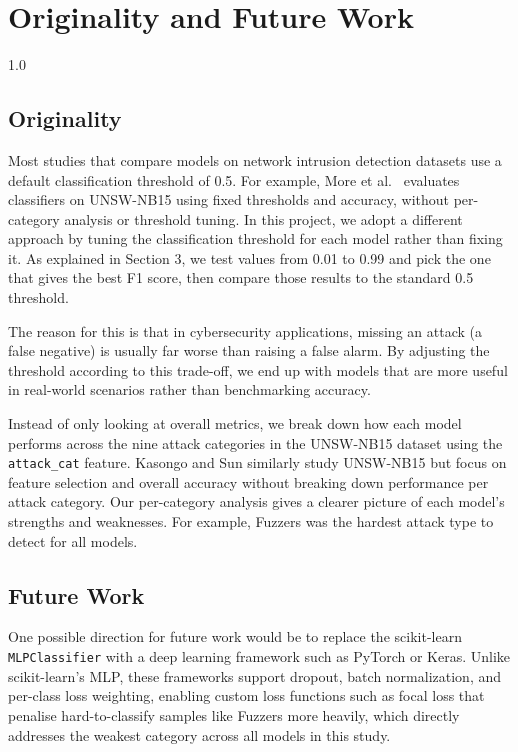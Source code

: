 \chapter{Originality and Future Work}
\begin{spacing}{1.0}
\small

\section{Originality}

Most studies that compare models on network intrusion detection datasets use a default classification threshold of 0.5. For example, More et al.\ \cite{more_2024_unsw} evaluates classifiers on UNSW-NB15 using fixed thresholds and accuracy, without per-category analysis or threshold tuning.
In this project, we adopt a different approach by tuning the classification threshold for each model rather than fixing it. As explained in Section 3, we test values from 0.01 to 0.99 and pick the one that gives the best F1 score, then compare those results to the standard
0.5 threshold.

The reason for this is that in cybersecurity applications, missing an attack (a false negative) is usually far worse than raising a false
alarm. By adjusting the threshold according to this trade-off, we end up with models that are more useful in real-world scenarios rather than benchmarking accuracy.

Instead of only looking at overall metrics, we break down how each model performs across the nine attack categories in the UNSW-NB15 dataset using the \texttt{attack\_cat} feature. Kasongo and Sun \cite{kasongo_sun_unsw} similarly study UNSW-NB15 but focus on feature selection and overall accuracy without breaking down performance per attack category. Our per-category analysis gives a clearer picture of each model's strengths and weaknesses. For example, Fuzzers was the hardest attack type to detect for all models.

\section{Future Work}

One possible direction for future work would be to replace the scikit-learn \texttt{MLPClassifier} with a deep learning
framework such as PyTorch or Keras. Unlike scikit-learn’s MLP, these frameworks support dropout, batch normalization, and
per-class loss weighting, enabling custom loss functions such as focal loss that penalise hard-to-classify samples like Fuzzers
more heavily, which directly addresses the weakest category across all models in this study.


\end{spacing}
